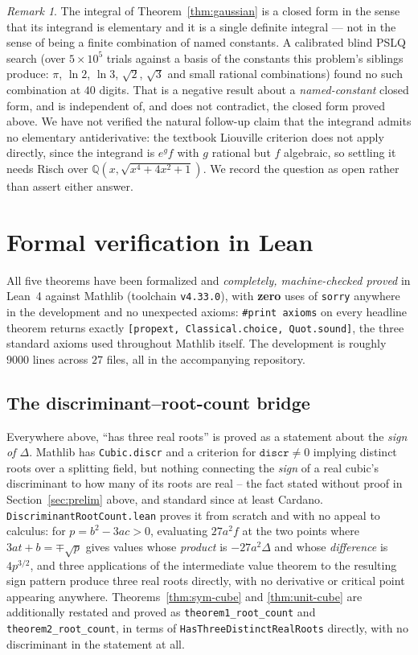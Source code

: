 \documentclass[11pt,reqno]{amsart}
\theoremstyle{plain}
\theoremstyle{remark}
\newtheorem{remark}[theorem]{Remark}
\newcommand{\disc}{\Delta}
\begin{document}
\begin{remark}
The integral of Theorem~\ref{thm:gaussian} is a closed form in the sense that
its integrand is elementary and it is a single definite integral --- not in
the sense of being a finite combination of named constants. A calibrated
blind PSLQ search (over $5\times10^5$ trials against a basis of the constants
this problem's siblings produce: $\pi$, $\ln2$, $\ln3$, $\sqrt2$, $\sqrt3$
and small rational combinations) found no such combination at $40$ digits.
That is a negative result about a \emph{named-constant} closed form, and is
independent of, and does not contradict, the closed form proved above. We
have not verified the natural follow-up claim that the integrand admits no
elementary antiderivative: the textbook Liouville criterion does not apply
directly, since the integrand is $e^{g}f$ with $g$ rational but $f$
algebraic, so settling it needs Risch over $\mathbb{Q}(x,\sqrt{x^4+4x^2+1})$.
We record the question as open rather than assert either answer.
\end{remark}

\section{Formal verification in Lean} \label{sec:lean}

All five theorems have been formalized and \emph{completely, machine-checked
proved} in Lean~4 against Mathlib (toolchain \texttt{v4.33.0}), with
\textbf{zero} uses of \texttt{sorry} anywhere in the development and no
unexpected axioms: \texttt{\#print axioms} on every headline theorem returns
exactly \texttt{[propext, Classical.choice, Quot.sound]}, the three standard
axioms used throughout Mathlib itself. The development is roughly $9000$
lines across $27$ files, all in the accompanying repository.

\subsection*{The discriminant--root-count bridge}
Everywhere above, ``has three real roots'' is proved as a statement about the
\emph{sign of $\disc$}. Mathlib has \texttt{Cubic.discr} and a criterion for
$\texttt{discr}\ne0$ implying distinct roots over a splitting field, but
nothing connecting the \emph{sign} of a real cubic's discriminant to how many
of its roots are real -- the fact stated without proof in
Section~\ref{sec:prelim} above, and standard since at least
Cardano. \texttt{DiscriminantRootCount.lean} proves it from scratch and with
no appeal to calculus: for $p=b^2-3ac>0$, evaluating $27a^2f$ at the two
points where $3at+b=\mp\sqrt p$ gives values whose \emph{product} is
$-27a^2\disc$ and whose \emph{difference} is $4p^{3/2}$, and three
applications of the intermediate value theorem to the resulting sign pattern
produce three real roots directly, with no derivative or critical point
appearing anywhere. Theorems~\ref{thm:sym-cube} and \ref{thm:unit-cube} are
additionally restated and proved as \texttt{theorem1\_root\_count} and
\texttt{theorem2\_root\_count}, in terms of \texttt{HasThreeDistinctRealRoots}
directly, with no discriminant in the statement at all.
\end{document}
